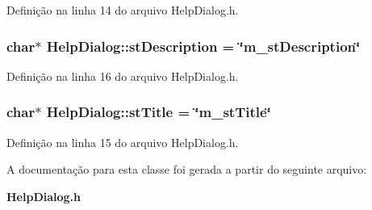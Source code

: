 Definição na linha 14 do arquivo Help\+Dialog.\+h.

\subsubsection[{st\+Description}]{\setlength{\rightskip}{0pt plus 5cm}char$\ast$ Help\+Dialog\+::st\+Description = \char`\"{}m\+\_\+st\+Description\char`\"{}\hspace{0.3cm}{\ttfamily [protected]}}\label{class_help_dialog_a108333ebf21aa4c077427ba107ac93cc}


Definição na linha 16 do arquivo Help\+Dialog.\+h.

\subsubsection[{st\+Title}]{\setlength{\rightskip}{0pt plus 5cm}char$\ast$ Help\+Dialog\+::st\+Title = \char`\"{}m\+\_\+st\+Title\char`\"{}\hspace{0.3cm}{\ttfamily [protected]}}\label{class_help_dialog_abec7e24408174c0d9897ff7e7361ebcb}


Definição na linha 15 do arquivo Help\+Dialog.\+h.



A documentação para esta classe foi gerada a partir do seguinte arquivo\+:\begin{DoxyCompactItemize}
\item 
{\bf Help\+Dialog.\+h}\end{DoxyCompactItemize}
